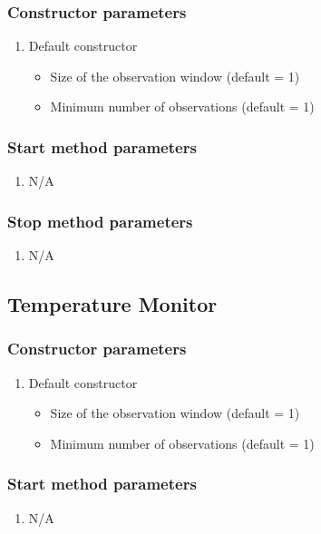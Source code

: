 \subsubsection*{Constructor parameters}
\begin{enumerate}
	\item Default constructor
		\begin{itemize}
			\item Size of the observation window (default = 1)
			\item Minimum number of observations (default = 1)
		\end{itemize}
\end{enumerate}

\subsubsection*{Start method parameters}
\begin{enumerate}
	\item[] N/A
\end{enumerate}


\subsubsection*{Stop method parameters}
\begin{enumerate}
	\item[] N/A
\end{enumerate}



\subsection{Temperature Monitor}

\subsubsection*{Constructor parameters}
\begin{enumerate}
	\item Default constructor
		\begin{itemize}
			\item Size of the observation window (default = 1)
			\item Minimum number of observations (default = 1)
		\end{itemize}
\end{enumerate}

\subsubsection*{Start method parameters}
\begin{enumerate}
	\item[] N/A
\end{enumerate}


